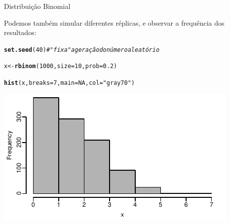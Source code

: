 \documentclass{beamer}\usepackage[]{graphicx}\usepackage[]{color}
\makeatletter
\def\maxwidth{ %
  \ifdim\Gin@nat@width>\linewidth
    \linewidth
  \else
    \Gin@nat@width
  \fi
}
\newcommand{\hlnum}[1]{\textcolor[rgb]{0.686,0.059,0.569}{#1}}%
\newcommand{\hlstr}[1]{\textcolor[rgb]{0.192,0.494,0.8}{#1}}%
\newcommand{\hlcom}[1]{\textcolor[rgb]{0.678,0.584,0.686}{\textit{#1}}}%
\newcommand{\hlstd}[1]{\textcolor[rgb]{0.345,0.345,0.345}{#1}}%
\newcommand{\hlkwb}[1]{\textcolor[rgb]{0.69,0.353,0.396}{#1}}%
\newcommand{\hlkwc}[1]{\textcolor[rgb]{0.333,0.667,0.333}{#1}}%
\newcommand{\hlkwd}[1]{\textcolor[rgb]{0.737,0.353,0.396}{\textbf{#1}}}%
\newenvironment{kframe}{%
 \def\at@end@of@kframe{}%
 \ifinner\ifhmode%
  \def\at@end@of@kframe{\end{minipage}}%
  \begin{minipage}{\columnwidth}%
 \fi\fi%
 \def\FrameCommand##1{\hskip\@totalleftmargin \hskip-\fboxsep
 \colorbox{shadecolor}{##1}\hskip-\fboxsep
     \hskip-\linewidth \hskip-\@totalleftmargin \hskip\columnwidth}%
 \MakeFramed {\advance\hsize-\width
   \@totalleftmargin\z@ \linewidth\hsize
   \@setminipage}}%
 {\par\unskip\endMakeFramed%
 \at@end@of@kframe}
\newenvironment{knitrout}{}{} %
\renewenvironment{knitrout}{\setlength{\topsep}{0mm}}{}
\makeatother
\begin{document}
\begin{frame}[fragile]{Distribuição Binomial}

\small{Podemos também simular diferentes réplicas, e observar a frequência dos resultados:}


\begin{knitrout}\tiny
{}\color{fgcolor}\begin{kframe}
\begin{alltt}
\hlkwd{set.seed}\hlstd{(}\hlnum{40}\hlstd{)} \hlcom{#"fixa" a geração do número aleatório}

\hlstd{x} \hlkwb{<-} \hlkwd{rbinom}\hlstd{(}\hlnum{1000}\hlstd{,}\hlkwc{size}\hlstd{=}\hlnum{10}\hlstd{,}\hlkwc{prob}\hlstd{=}\hlnum{0.2}\hlstd{)}

\hlkwd{hist}\hlstd{(x,}\hlkwc{breaks}\hlstd{=}\hlnum{7}\hlstd{,}\hlkwc{main}\hlstd{=}\hlnum{NA}\hlstd{,}\hlkwc{col}\hlstd{=}\hlstr{"gray70"}\hlstd{)}
\end{alltt}
\end{kframe}
\includegraphics[width=\maxwidth]{figure/binom_freq-1} 

\end{knitrout}

\end{frame} 
\end{document}
